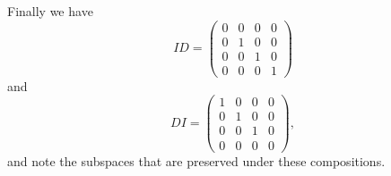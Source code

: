 {Finally we have
\[
I D = \begin{pmatrix}
0 & 0 & 0 & 0 \\
0 & 1 & 0 & 0 \\
0 & 0 & 1 & 0 \\
0 & 0 & 0 & 1
\end{pmatrix}
\]
and
\[
D I = \begin{pmatrix}
1 & 0 & 0 & 0 \\
0 & 1 & 0 & 0 \\
0 & 0 & 1 & 0 \\
0 & 0 & 0 & 0
\end{pmatrix},
\]
and note the subspaces that are preserved under these compositions.

} %

\newpage
